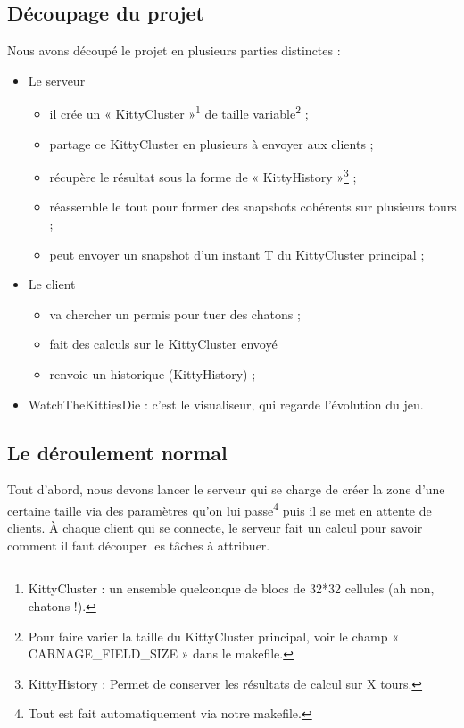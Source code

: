 \documentclass[twoside]{article}
\begin{document}
\subsection{Découpage du projet}
Nous avons découpé le projet en plusieurs parties distinctes : 
\begin{itemize}
	\item Le serveur 
		\begin{itemize}
			\item il crée un « KittyCluster »\protect\footnote{
					KittyCluster : un ensemble quelconque de blocs de 32*32 cellules (ah non, chatons !).
				} de taille variable\protect\footnote{
					Pour faire varier la taille du KittyCluster principal, 
						 voir le champ « CARNAGE\_FIELD\_SIZE » dans le makefile.
				} ;
			\item partage ce KittyCluster en plusieurs à envoyer aux clients ;
			\item récupère le résultat sous la forme de « KittyHistory »\protect\footnote{
					KittyHistory : Permet de conserver les résultats de calcul sur X tours.
				}	;
			\item réassemble le tout pour former des snapshots cohérents sur plusieurs tours ;
			\item peut envoyer un snapshot d'un instant T du KittyCluster principal ;
		\end{itemize}
	\item Le client
		\begin{itemize}
			\item va chercher un permis pour tuer des chatons ;
			\item fait des calculs sur le KittyCluster envoyé  
			\item renvoie un historique (KittyHistory) ;
		\end{itemize}
	\item WatchTheKittiesDie : c'est le visualiseur, qui regarde l'évolution du jeu.
\end{itemize}
\subsection{Le déroulement normal}
Tout d'abord, nous devons lancer le serveur qui se charge de créer la zone d'une certaine taille via des paramètres qu'on lui passe\protect\footnote{
	Tout est fait automatiquement via notre makefile.
} puis il se met en attente de clients.
À chaque client qui se connecte, le serveur fait un calcul pour savoir comment il faut découper les tâches à attribuer.
\end{document}
